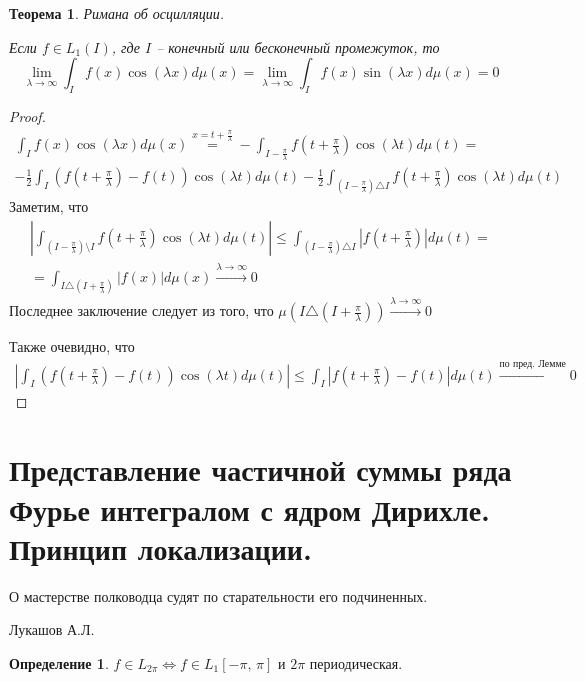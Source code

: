 \documentclass[a4paper,12pt]{article}
\renewcommand{\leq}{\ensuremath{\leqslant}}
\theoremstyle{plain}
\newtheorem{theorem}{Теорема}[section]
\theoremstyle{definition}
\newtheorem{definition}{Определение}[section]
\theoremstyle{remark}
\begin{document}
\begin{theorem}
	Римана об осцилляции.

	Если $f \in L_1(I)$, где $I$ -- конечный или бесконечный промежуток, то
	\[\lim_{\lambda \to \infty} \int_I f(x)\cos(\lambda x) d \mu(x) = \lim_{\lambda \to \infty} \int_I f(x) \sin (\lambda x) d\mu(x) = 0\]
\end{theorem}

\begin{proof}
	\begin{align*}
		\int_I f(x) \cos(\lambda x) d\mu(x) \stackrel{x = t + \frac{\pi}{\lambda}}{=} - \int_{I - \frac{\pi}{\lambda}} f\left( t + \frac{\pi}{\lambda} \right) \cos(\lambda t) d \mu(t) = \\
		-\frac{1}{2} \int_I \left(f\left(t + \frac{\pi}{\lambda}\right) - f(t) \right)\cos(\lambda t) d\mu(t) - \frac{1}{2} \int_{(I - \frac{\pi}{\lambda}) \triangle I} f\left(t + \frac{\pi}{\lambda}\right) \cos(\lambda t) d \mu(t)
	\end{align*}
	Заметим, что
	\begin{align*}
		\left|\int_{(I - \frac{\pi}{\lambda}) \setminus I} f\left(t + \frac{\pi}{\lambda}\right) \cos(\lambda t) d \mu(t)\right| \leq \int_{(I - \frac{\pi}{\lambda}) \triangle I} \left|f\left(t + \frac{\pi}{\lambda}\right)\right| d\mu(t) = \\
		= \int_{I \triangle (I + \frac{\pi}{\lambda})} |f(x)|d\mu(x) \stackrel{\lambda \to \infty}{\to} 0
	\end{align*}
	Последнее заключение следует из того, что $\mu\left(I \triangle (I + \frac{\pi}{\lambda})\right) \stackrel{\lambda \to \infty}{\to} 0$

	Также очевидно, что
	\begin{align*}
		\left|\int_I \left(f\left(t + \frac{\pi}{\lambda}\right) - f(t) \right)\cos(\lambda t) d\mu(t)\right| \leq \int_I \left|f\left(t + \frac{\pi}{\lambda}\right) - f(t)\right|d\mu(t) \stackrel{\text{по пред. Лемме}}{\to} 0
	\end{align*}
\end{proof}

\section{Представление частичной суммы ряда Фурье интегралом с ядром Дирихле. Принцип локализации.}

\epigraph{О мастерстве полководца судят по старательности его подчиненных.}{Лукашов А.Л.}

\begin{definition}
	$f \in L_{2\pi} \Leftrightarrow f \in L_1[-\pi,\,\pi]$ и $2\pi$ периодическая.
\end{definition}
\end{document}
